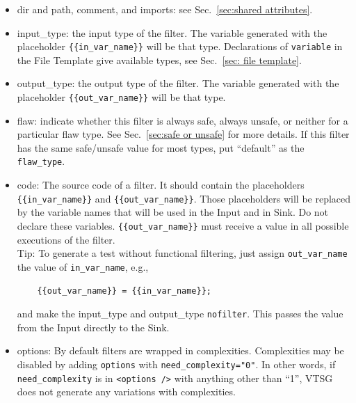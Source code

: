 \documentclass[12pt]{article}
\begin{document}
\begin{itemize}
    \item dir and path, comment, and imports: see Sec.~\ref{sec:shared attributes}.

    \item input\_type: the input type of the filter. The variable 
    generated with
    the placeholder \verb|{{in_var_name}}| will be that type.
    Declarations of \verb|variable| in the File Template give
    available types, see Sec.~\ref{sec: file template}.

    \item output\_type: the output type of the filter.  The variable generated
    with the placeholder \verb|{{out_var_name}}| will be that type.

    \item flaw: indicate whether this filter is always safe, always unsafe, or
      neither for a particular flaw type.  See Sec.~\ref{sec:safe or unsafe} for
      more details.  If this filter has the same safe/unsafe value for most
      types, put ``default'' as the \verb|flaw_type|.

    \item code: The source code of a filter. It should contain the placeholders
    \\
    \verb|{{in_var_name}}| and \verb|{{out_var_name}}|.  Those placeholders will 
    be replaced by the variable names that will be used in the Input and in Sink.  Do
    not declare these variables.
    \verb|{{out_var_name}}| must receive a value in all possible executions of the
    filter.
    \\
    Tip: To generate a test without functional filtering, just assign
    \verb|out_var_name| the value of \verb|in_var_name|, e.g.,
\begin{verbatim}
    {{out_var_name}} = {{in_var_name}};
\end{verbatim}
    and make the input\_type and output\_type \verb|nofilter|.
    This passes the value from the Input directly to the Sink.

    \item options: By default filters are wrapped in complexities.  Complexities may
      be disabled by adding \verb|options| with \verb|need_complexity="0"|.
      \label{sec:need complexity}
      In other words, if \linebreak[4] \verb|need_complexity| is in
      \verb|<options />| with anything other than ``1'', VTSG does not generate any
      variations with complexities.
\end{itemize}
\end{document}
